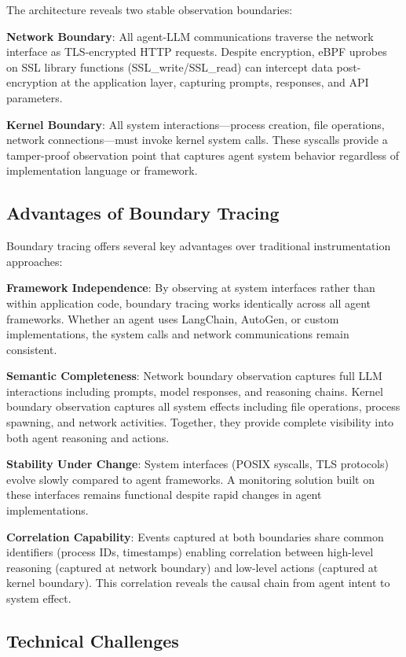 \documentclass[sigplan,screen，review,9pt]{acmart}
\begin{document}
The architecture reveals two stable observation boundaries:

\textbf{Network Boundary}: All agent-LLM communications traverse the network interface as TLS-encrypted HTTP requests. Despite encryption, eBPF uprobes on SSL library functions (SSL\_write/SSL\_read) can intercept data post-encryption at the application layer, capturing prompts, responses, and API parameters.

\textbf{Kernel Boundary}: All system interactions—process creation, file operations, network connections—must invoke kernel system calls. These syscalls provide a tamper-proof observation point that captures agent system behavior regardless of implementation language or framework.

\subsection{Advantages of Boundary Tracing}

Boundary tracing offers several key advantages over traditional instrumentation approaches:

\textbf{Framework Independence}: By observing at system interfaces rather than within application code, boundary tracing works identically across all agent frameworks. Whether an agent uses LangChain, AutoGen, or custom implementations, the system calls and network communications remain consistent.

\textbf{Semantic Completeness}: Network boundary observation captures full LLM interactions including prompts, model responses, and reasoning chains. Kernel boundary observation captures all system effects including file operations, process spawning, and network activities. Together, they provide complete visibility into both agent reasoning and actions.

\textbf{Stability Under Change}: System interfaces (POSIX syscalls, TLS protocols) evolve slowly compared to agent frameworks. A monitoring solution built on these interfaces remains functional despite rapid changes in agent implementations.

\textbf{Correlation Capability}: Events captured at both boundaries share common identifiers (process IDs, timestamps) enabling correlation between high-level reasoning (captured at network boundary) and low-level actions (captured at kernel boundary). This correlation reveals the causal chain from agent intent to system effect.

\subsection{Technical Challenges}
\end{document}
